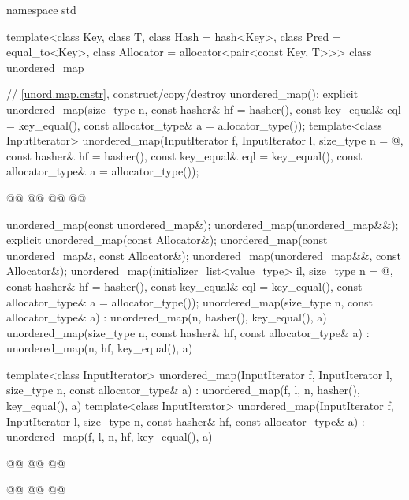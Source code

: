 \documentclass{wg21}
\begin{document}
%
\begin{codeblock}
namespace std {
template<class Key,
class T,
class Hash = hash<Key>,
class Pred = equal_to<Key>,
class Allocator = allocator<pair<const Key, T>>>
class unordered_map {
    // \ref{unord.map.cnstr}, construct/copy/destroy
    unordered_map();
    explicit unordered_map(size_type n, const hasher& hf = hasher(),
        const key_equal& eql = key_equal(), const allocator_type& a = allocator_type());
    template<class InputIterator>
    unordered_map(InputIterator f, InputIterator l, size_type n = @\seebelow@,
        const hasher& hf = hasher(), const key_equal& eql = key_equal(),
        const allocator_type& a = allocator_type());

    @@
    @@
    @@
    @@

    unordered_map(const unordered_map&);
    unordered_map(unordered_map&&);
    explicit unordered_map(const Allocator&);
    unordered_map(const unordered_map&, const Allocator&);
    unordered_map(unordered_map&&, const Allocator&);
    unordered_map(initializer_list<value_type> il, size_type n = @\seebelow@,
        const hasher& hf = hasher(),
        const key_equal& eql = key_equal(),
        const allocator_type& a = allocator_type());
    unordered_map(size_type n, const allocator_type& a)
    : unordered_map(n, hasher(), key_equal(), a) { }
    unordered_map(size_type n, const hasher& hf, const allocator_type& a)
    : unordered_map(n, hf, key_equal(), a) { }

    template<class InputIterator>
    unordered_map(InputIterator f, InputIterator l, size_type n, const allocator_type& a)
    : unordered_map(f, l, n, hasher(), key_equal(), a) { }
    template<class InputIterator>
    unordered_map(InputIterator f, InputIterator l, size_type n, const hasher& hf,
    const allocator_type& a)
    : unordered_map(f, l, n, hf, key_equal(), a) { }

    @@
    @@
    @@

    @@
    @@
    @@



}}
\end{codeblock}
\end{document}

